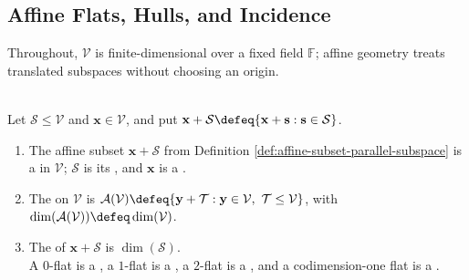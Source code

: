 \subsection{Affine Flats, Hulls, and Incidence}

%

Throughout, $\mathcal{V}$ is finite-dimensional over a fixed field $\mathbb{F}$; affine geometry treats translated subspaces without choosing an origin.

\begin{definition} \label{def:flat-affine-geometry} \\
Let $\mathcal{S}\leq\mathcal{V}$ and $\mathbf{x}\in\mathcal{V}$, and put $\mathbf{x}+\mathcal{S}\defeq\{\mathbf{x}+\mathbf{s}:\mathbf{s}\in\mathcal{S}\}$.
\begin{enumerate}[label=(\roman*)]
\setlength{\itemsep}{0pt}
\item The affine subset $\mathbf{x}+\mathcal{S}$ from Definition \ref{def:affine-subset-parallel-subspace} is a  in $\mathcal{V}$; $\mathcal{S}$ is its , and $\mathbf{x}$ is a .
\item The  on $\mathcal{V}$ is $\mathcal{A}(\mathcal{V})\defeq\{\mathbf{y}+\mathcal{T}:\mathbf{y}\in\mathcal{V},\ \mathcal{T}\leq\mathcal{V}\}$, with $\dim(\mathcal{A}(\mathcal{V}))\defeq\dim(\mathcal{V})$.
\item The  of $\mathbf{x}+\mathcal{S}$ is $\dim(\mathcal{S})$.\\
A $0$-flat is a , a $1$-flat is a , a $2$-flat is a , and a codimension-one flat is a .
\end{enumerate}
\end{definition}

